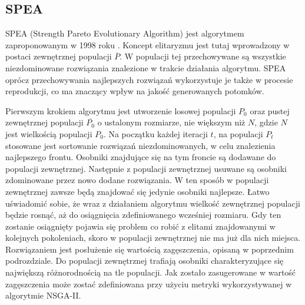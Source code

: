 \documentclass[twoside]{iisthesis}
\begin{document}
\subsection{SPEA}
SPEA (Strength Pareto Evolutionary Algorithm) jest algorytmem zaproponowanym w 1998 roku \cite{spea}. Koncept elitaryzmu jest tutaj wprowadzony w postaci zewnętrznej populacji $\overline{P}$. W populacji tej przechowywane są wszystkie niezdominowane rozwiązania znalezione w trakcie działania algorytmu. SPEA oprócz przechowywania najlepszych rozwiązań wykorzystuje je także w procesie reprodukcji, co ma znaczący wpływ na jakość generowanych potomków.

Pierwszym krokiem algorytmu jest utworzenie losowej populacji $P_{0}$ oraz pustej zewnętrznej populacji $\overline{P_{0}}$ o ustalonym rozmiarze, nie większym niż $N$, gdzie $N$ jest wielkością populacji $P_{0}$. Na początku każdej iteracji $t$, na populacji $P_{t}$ stosowane jest sortowanie rozwiązań niezdominowanych, w celu znalezienia najlepszego frontu. Osobniki znajdujące się na tym froncie są dodawane do populacji zewnętrznej. Następnie z populacji zewnętrznej usuwane są osobniki zdominowane przez nowo dodane rozwiązania. W ten sposób w populacji zewnętrznej zawsze będą znajdować się jedynie osobniki najlepsze. Łatwo uświadomić sobie, że wraz z działaniem algorytmu wielkość zewnętrznej populacji będzie rosnąć, aż do osiągnięcia zdefiniowanego wcześniej rozmiaru. Gdy ten zostanie osiągnięty pojawia się problem co robić z elitami znajdowanymi w kolejnych pokoleniach, skoro w populacji zewnętrznej nie ma już dla nich miejsca. Rozwiązaniem jest posłużenie się wartością zagęszczenia, opisaną w poprzednim podrozdziale. Do populacji zewnętrznej trafiają osobniki charakteryzujące się największą różnorodnością na tle populacji. Jak zostało zasugerowane w \cite{book} wartość zagęszczenia może zostać zdefiniowana przy użyciu metryki wykorzystywanej w algorytmie NSGA-II.
\end{document}
